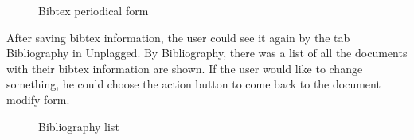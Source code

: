 \begin{figure}[!h]
  \centering
  \caption{Bibtex periodical form}
  \label{fig:Bibtex_periodical_form}
\end{figure}

After saving bibtex information, the user could see it again by the tab Bibliography in Unplagged. By Bibliography, there was a list of all the documents with their bibtex information are shown. If the user would like to change something, he could choose the action button to come back to the document modify form.

\begin{figure}[!h]
  \centering
  \caption{Bibliography list}
  \label{fig:Bibliography_list}
\end{figure}

